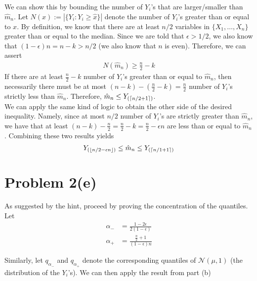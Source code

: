 \documentclass[11pt]{article}
\newcommand{\1}{\mathbb{I}} %
\begin{document}
We can show this by bounding the number of $Y_i$'s that are larger/smaller than $\hat m_n$. Let $N(x) := |\{ Y_i: Y_i \geq \hat x  \}|$ denote the number of $Y_i$'s greater than or equal to $x$. By definition, we know that there are at least $n/2$ variables in $\{X_1, \ldots, X_n\}$ greater than or equal to the median. Since we are told that $\epsilon > 1/2$, we also know that $(1 - \epsilon)n = n - k > n/2$ (we also know that $n$ is even). Therefore, we can assert
\begin{align}
	N(\hat m_n) \geq \frac{n}{2} - k 
\end{align}
If there are at least $\frac{n}{2} - k$ number of $Y_i$'s greater than or equal to $\hat m_n$, then necessarily there must be at most $(n - k) - (\frac{n}{2} - k) = \frac{n}{2}$  number of $Y_i$'s strictly less than $\hat m_n$. Therefore, $\hat m_n \leq Y_{\left(  \lceil n/2 + 1 \rceil  \right)}$. \\

We can apply the same kind of logic to obtain the other side of the desired inequality. Namely, since at most $n / 2$ number of $Y_i$'s are strictly greater than $\hat m_n$, we have that at least $(n- k) - \frac{n}{2} = \frac{n}{2} - k = \frac{n}{2} - \epsilon n$ are less than or equal to $\hat m_n$. Combining these two results yields
\begin{align}
			Y_{\left(  \lfloor n/2 - \epsilon n  \rfloor  \right)}
	\leq \hat m_n \leq
	Y_{\left(  \lceil n/1 + 1 \rceil  \right)}
\end{align}



\clearpage 
\section*{Problem 2(e)}

As suggested by the hint, proceed by proving the concentration of the quantiles. Let
\begin{align}
	\alpha_- &= \frac{1 - 2\epsilon}{2(1 - \epsilon)} \\
	\alpha_+ &= \frac{\frac{n}{2} + 1}{(1 - \epsilon)n}
\end{align}

Similarly, let $q_{\alpha_-}$ and $q_{\alpha_+}$ denote the corresponding quantiles of $\mathcal{N}(\mu, 1)$ (the distribution of the $Y_i$'s). We can then apply the result from part (b)
\end{document}
